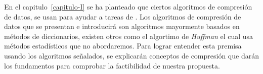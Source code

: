 En el capitulo~\ref{capitulo-I} se ha planteado que ciertos algoritmos de compresión de datos, se usan para ayudar a tareas de \machinelearning. Los algoritmos de compresión de datos que se presentan e introducirá son algoritmos mayormente basados en métodos de diccionarios, existen otros como el algortimo de \emph{Huffman} el cual usa métodos estadísticos que no abordaremos. Para lograr entender esta premisa usando los algoritmos señalados, se explicarán conceptos de compresión que darán los fundamentos para comprobar la factibilidad de nuestra propuesta. 


